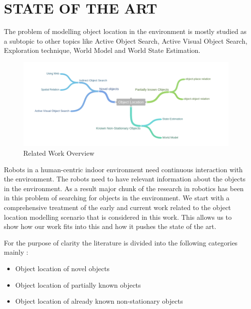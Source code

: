 \chapter{STATE OF THE ART}

The problem of modelling object location in the environment is mostly studied as a subtopic to other topics like Active Object Search, Active Visual Object Search, Exploration technique, World Model and World State Estimation.

\begin{figure}[htp]
\centering
\includegraphics[scale=0.45]{pictures/location_of_object.png}
\caption{Related Work Overview}
\label{Related Work}
\end{figure}

Robots in a human-centric indoor environment need continuous interaction with the environment. The robots need to have relevant information about the objects in the environment. As a result major chunk of the research in robotics has been in this problem of searching for objects in the environment.
We start with a comprehensive treatment of the early and current work related to the object location modelling scenario that is considered in this work. This allows us to show how our work fits into this and how it pushes the state of the art.

For the purpose of clarity the literature is divided into the following categories mainly : 
\begin{itemize}
	\item Object location of novel objects 
	\item Object location of partially known objects
	\item Object location of already known non-stationary objects
\end{itemize}
